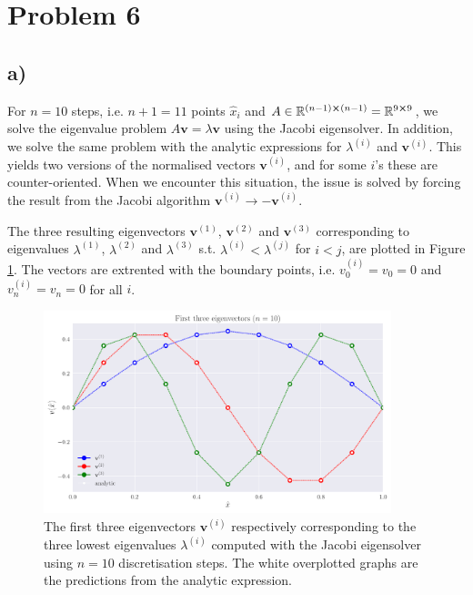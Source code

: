 \documentclass[english,notitlepage,nofootinbib]{revtex4-1}  %
\renewcommand{\vec}{\mathbf}
\begin{document}
\section*{Problem 6}

\subsection*{a)}

For $n=10$ steps, i.e. $n+1=11$ points $\hat{x}_i$ and $A\in\mathbb{R}^{(n-1)\cross(n-1)} =\mathbb{R}^{9\cross 9}$, we solve the eigenvalue problem $A\vec{v} = \lambda \vec{v}$ using the Jacobi eigensolver. In addition, we solve the same problem with the analytic expressions for $\lambda^{(i)}$ and $\vec{v}^{(i)}$. This yields two versions of the normalised vectors $\vec{v}^{(i)}$, and for some $i$'s these are counter-oriented. When we encounter this situation, the issue is solved by forcing the result from the Jacobi algorithm $\vec{v}^{(i)} \rightarrow - \vec{v}^{(i)}$.

The three resulting eigenvectors $\vec{v}^{(1)}$, $\vec{v}^{(2)}$ and $\vec{v}^{(3)}$ corresponding to eigenvalues $\lambda^{(1)}$, $\lambda^{(2)}$ and $\lambda^{(3)}$ s.t. $\lambda^{(i)}<\lambda^{(j)}$ for $i<j$, are plotted in Figure \ref{fig:p6_solution_10steps}. The vectors are extrented with the boundary points, i.e. $v_0^{(i)}=v_0 = 0$ and $v_n^{(i)}=v_n=0$ for all $i$.


\begin{figure}[h!]
    \centering
    \includegraphics[width=0.9\textwidth]{solution_10steps.pdf}
    \caption{The first three eigenvectors $\vec{v}^{(i)}$ respectively corresponding to the three lowest eigenvalues $\lambda^{(i)}$ computed with the Jacobi eigensolver using $n=10$ discretisation steps. The white overplotted graphs are the predictions from the analytic expression.}\label{fig:p6_solution_10steps}
\end{figure}
\end{document}
